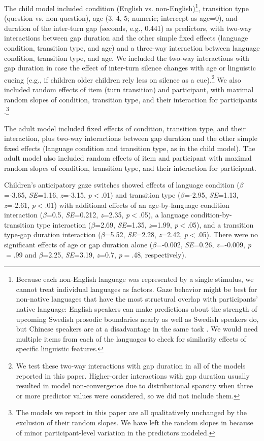 \documentclass[authoryear, 12pt]{elsarticle}
\begin{document}
The child model included condition (English vs. non-English)\footnote{Because each non-English language was represented by a single stimulus, we cannot treat individual languages as factors. Gaze behavior might be best for non-native languages that have the most structural overlap with participants' native language: English speakers can make predictions about the strength of upcoming Swedish prosodic boundaries nearly as well as Swedish speakers do, but Chinese speakers are at a disadvantage in the same task \citep{carlson2005}. We would need multiple items from each of the languages to check for similarity effects of specific linguistic features.}, transition type (question vs. non-question), age (3, 4, 5; numeric; intercept as age=0), and duration of the inter-turn gap (seconds, e.g., 0.441) as predictors, with two-way interactions between gap duration and the other simple fixed effects (language condition, transition type, and age) and a three-way interaction between language condition, transition type, and age.  We included the two-way interactions with gap duration in case the effect of inter-turn silence changes with age or linguistic cueing (e.g., if children older children rely less on silence as a cue).\footnote{We test these two-way interactions with gap duration in all of the models reported in this paper. Higher-order interactions with gap duration usually resulted in model non-convergence due to distributional sparsity when three or more predictor values were considered, so we did not include them.} We also included random effects of item (turn transition) and participant, with maximal random slopes of condition, transition type, and their interaction for participants \citep{barr2013}.\footnote{The models we report in this paper are all qualitatively unchanged by the exclusion of their random slopes. We have left the random slopes in because of minor participant-level variation in the predictors modeled.}

The adult model included fixed effects of condition, transition type, and their interaction, plus two-way interactions between gap duration and the other simple fixed effects (language condition and transition type, as in the child model). The adult model also included random effects of item and participant with maximal random slopes of condition, transition type, and their interaction for participant.

Children's anticipatory gaze switches showed effects of language condition (\textit{$\beta$}=-3.65, \textit{SE}=1.16, \textit{z}=-3.15, \textit{p}$<$.01) and transition type (\textit{$\beta$}=-2.95, \textit{SE}=1.13, \textit{z}=-2.61, \textit{p}$<$.01) with additional effects of an age-by-language condition interaction (\textit{$\beta$}=0.5, \textit{SE}=0.212, \textit{z}=2.35, \textit{p}$<$.05), a language condition-by-transition type interaction (\textit{$\beta$}=2.69, \textit{SE}=1.35, \textit{z}=1.99, \textit{p}$<$.05), and a transition type-gap duration interaction (\textit{$\beta$}=5.52, \textit{SE}=2.28, \textit{z}=2.42, \textit{p}$<$.05). There were no significant effects of age or gap duration alone (\textit{$\beta$}=-0.002, \textit{SE}=0.26, \textit{z}=-0.009, \textit{p}$=$.99 and \textit{$\beta$}=2.25, \textit{SE}=3.19, \textit{z}=0.7, \textit{p}$=$.48, respectively).
\end{document}
